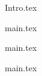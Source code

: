 \documentclass[addpoints]{exam}
\begin{document}
{Intro.tex}

\newpage

\tableofcontents 

\newpage 

{main.tex}

\newpage 

{main.tex}

\newpage

{main.tex}
\end{document}
